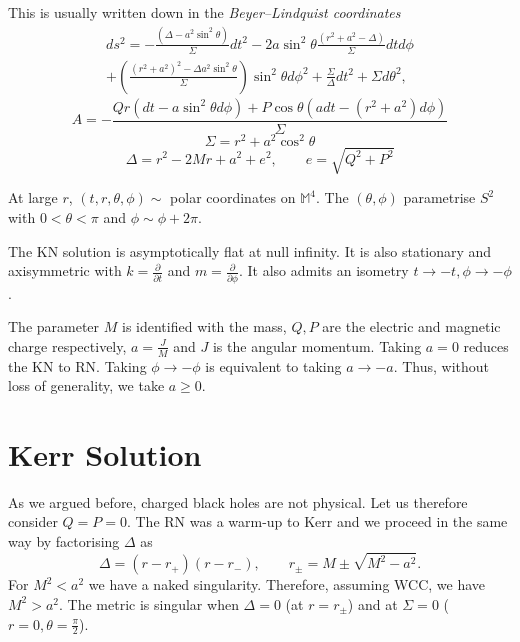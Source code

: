 This is usually written down in the \emph{Beyer--Lindquist coordinates}
\begin{multline}
  ds^2 = -\frac{(\Delta - a^2 \sin^2 \theta)}{\Sigma} d t^2 - 2 a \sin^2 \theta \frac{(r^2+ a^2 - \Delta)}{\Sigma} dt d\phi \\
  + \left( \frac{(r^2 + a^2)^2 - \Delta a^2 \sin^2 \theta}{\Sigma} \right) \sin^2 \theta d\phi^2
  + \frac{\Sigma}{\Delta} dt^2 + \Sigma d\theta^2,
\end{multline}
\begin{equation}
  A = -\frac{Qr (dt - a \sin^2 \theta d\phi) + P \cos \theta (a dt - (r^2 + a^2) d\phi)}{\Sigma}
\end{equation}
\begin{equation}
  \Sigma = r^2 + a^2 \cos ^2 \theta
\end{equation}
\begin{equation}
  \Delta = r^2 - 2 M r + a^2 + e^2, \qquad e = \sqrt{Q^2 + P^2}
\end{equation}

At large $r$, $(t, r, \theta, \phi) \sim$ polar coordinates on $\mathbb{M}^4$.
The $(\theta, \phi)$ parametrise $S^2$ with $0 < \theta < \pi$ and $\phi \sim \phi + 2 \pi$.

The KN solution is asymptotically flat at null infinity.
It is also stationary and axisymmetric with $k = \frac{\partial }{\partial t}$ and $m = \frac{\partial }{\partial \phi}$.
It also admits an isometry $t \to - t, \phi \to - \phi$.

The parameter $M$ is identified with the mass, $Q, P$ are the electric and magnetic charge respectively, $a = \frac{J}{M}$ and $J$ is the angular momentum.
Taking $a =0$ reduces the KN to RN.
Taking $\phi \to - \phi$ is equivalent to taking $a \to -a$. Thus, without loss of generality, we take $a \geq 0$.

\section{Kerr Solution}%
\label{sec:kerr_solution}

As we argued before, charged black holes are not physical. Let us therefore consider $Q = P = 0$.
The RN was a warm-up to Kerr and we proceed in the same way by factorising $\Delta$ as
\begin{equation}
  \Delta = (r - r_+)(r - r_-), \qquad r_{\pm} = M \pm \sqrt{M^2 - a^2}.
\end{equation}
For $M^2 < a^2$ we have a naked singularity.
Therefore, assuming WCC, we have $M^2 > a^2$.
The metric is singular when $\Delta = 0$ (at $r = r_\pm$) and at $\Sigma = 0$ ($r = 0, \theta = \frac{\pi}{2}$).

